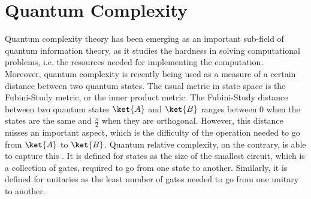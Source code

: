 \chapter{Quantum Complexity}
Quantum complexity theory has been emerging as an important sub-field of quantum information theory, as it studies the hardness in solving computational problems, i.e. the resources needed for implementing the computation.
\\
Moreover, quantum complexity is recently being used as a measure of a certain distance between two quantum states. The usual metric in state space is the Fubini-Study metric, or the inner product metric. The Fubini-Study distance between two quantum states $\ket{A}$ and $\ket{B}$ ranges between 0 when the states are the same and $\frac{\pi}{2}$ when they are orthogonal. However, this distance misses an important aspect, which is the difficulty of the operation needed to go from $\ket{A}$ to $\ket{B}$. Quantum relative complexity, on the contrary, is able to capture this \cite{brown2018second}. It is defined for states as the size of the smallest circuit, which is a collection of gates, required to go from one state to another. Similarly, it is defined for unitaries as the least number of gates needed to go from one unitary to another.


